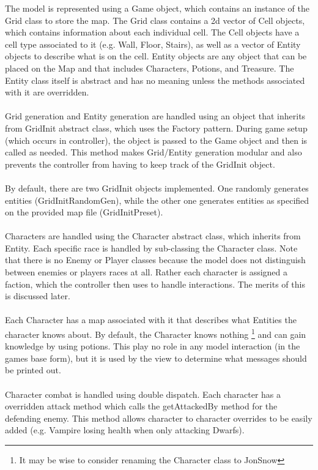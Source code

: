 \documentclass[12pt]{article}
\begin{document}
The model is represented using a Game object, which contains an instance of the Grid class to store the map. The Grid class contains a 2d vector of Cell objects, which contains information about each individual cell. The Cell objects have a cell type associated to it (e.g. Wall, Floor, Stairs), as well as a vector of Entity objects to describe what is on the cell. Entity objects are any object that can be placed on the Map and that includes Characters, Potions, and Treasure. The Entity class itself is abstract and has no meaning unless the methods associated with it are overridden. \\
\\
Grid generation and Entity generation are handled using an object that inherits from GridInit abstract class, which uses the Factory pattern. During game setup (which occurs in controller), the object is passed to the Game object and then is called as needed. This method makes Grid/Entity generation modular and also prevents the controller from having to keep track of the GridInit object.\\
\\
By default, there are two GridInit objects implemented. One randomly generates entities (GridInitRandomGen), while the other one generates entities as specified on the provided map file (GridInitPreset).
\\
\\
Characters are handled using the Character abstract class, which inherits from Entity. Each specific race is handled by sub-classing the Character class. Note that there is no Enemy or Player classes because the model does not distinguish between enemies or players races at all. Rather each character is assigned a faction, which the controller then uses to handle interactions. The merits of this is discussed later. \\
\\
Each Character has a map associated with it that describes what Entities the character knows about. By default, the Character knows nothing \footnote{It may be wise to consider renaming the Character class to JonSnow} and can gain knowledge by using potions. This play no role in any model interaction (in the games base form), but it is used by the view to determine what messages should be printed out. \\
\\
Character combat is handled using double dispatch. Each character has a overridden attack method which calls the getAttackedBy method for the defending enemy. This method allows character to character overrides to be easily added (e.g. Vampire losing health when only attacking Dwarfs). \\
\end{document}
